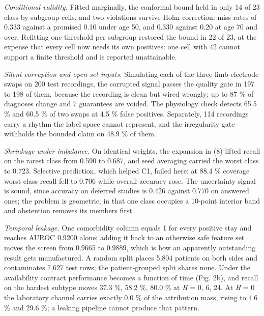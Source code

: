 \documentclass[conference,a4paper]{IEEEtran}
\begin{document}
\textit{Conditional validity.} Fitted marginally, the conformal bound held in only 14 of 23 class-by-subgroup cells, and two violations survive Holm correction: miss rates of 0.333 against a promised 0.10 under age 50, and 0.330 against 0.20 at age 70 and over. Refitting one threshold per subgroup \cite{ref20} restored the bound in 22 of 23, at the expense that every cell now needs its own positives: one cell with 42 cannot support a finite threshold and is reported unattainable.

\textit{Silent corruption and open-set inputs.} Simulating each of the three limb-electrode swaps on 200 test recordings, the corrupted signal passes the quality gate in 197 to 198 of them, because the recording is clean but wired wrongly; up to 87 \% of diagnoses change and 7 guarantees are voided. The physiology check detects 65.5 \% and 60.5 \% of two swaps at 4.5 \% false positives. Separately, 114 recordings carry a rhythm the label space cannot represent, and the irregularity gate withholds the bounded claim on 48.9 \% of them.

\textit{Shrinkage under imbalance.} On identical weights, the expansion in (8) lifted recall on the rarest class from 0.590 to 0.687, and seed averaging carried the worst class to 0.723. Selective prediction, which helped C1, failed here: at 88.4 \% coverage worst-class recall fell to 0.706 while overall accuracy rose. The uncertainty signal is sound, since accuracy on deferred studies is 0.426 against 0.770 on answered ones; the problem is geometric, in that one class occupies a 10-point interior band and abstention removes its members first.

\textit{Temporal leakage.} One comorbidity column equals 1 for every positive stay and reaches AUROC 0.9200 alone; adding it back to an otherwise safe feature set moves the screen from 0.9665 to 0.9889, which is how an apparently outstanding result gets manufactured. A random split places 5,804 patients on both sides and contaminates 7,627 test rows; the patient-grouped split shares none. Under the availability contract performance becomes a function of time (Fig. 2b), and recall on the hardest subtype moves 37.3 \%, 58.2 \%, 80.0 \% at \textit{H} = 0, 6, 24. At \textit{H} = 0 the laboratory channel carries exactly 0.0 \% of the attribution mass, rising to 4.6 \% and 29.6 \%; a leaking pipeline cannot produce that pattern.
\end{document}
